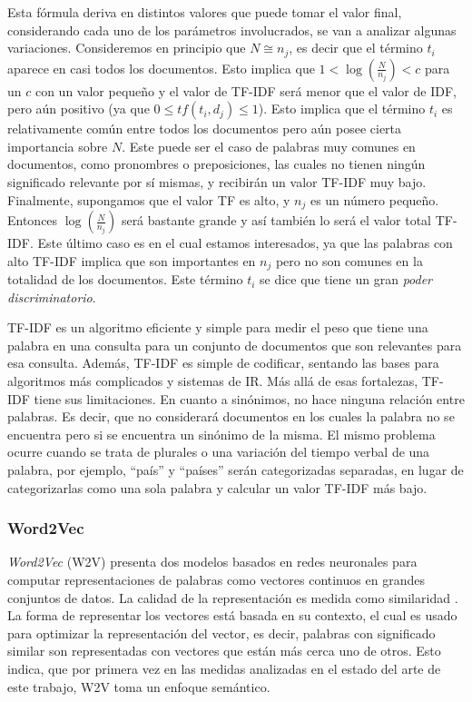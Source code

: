 Esta fórmula deriva en distintos valores que puede tomar el valor final, considerando cada uno de los parámetros involucrados, se van a analizar algunas variaciones. Consideremos en principio que \(N \cong n_j\), es decir que el término \(t_i\) aparece en casi todos los documentos. Esto implica que \(1 <  \log(\frac{N}{n_j}) < c \) para un \(c\) con un valor pequeño y el valor de TF-IDF será menor que el valor de IDF, pero aún positivo (ya que \(0 \leq tf(t_i,d_j) \leq 1\)). Esto implica que el término \(t_i\) es relativamente común entre todos los documentos pero aún posee cierta importancia sobre \(N\). Este puede ser el caso de palabras muy comunes en documentos, como pronombres o preposiciones, las cuales no tienen ningún significado relevante por sí mismas, y recibirán un valor TF-IDF muy bajo. Finalmente, supongamos que el valor TF es alto, y \(n_j\) es un número pequeño. Entonces \(\log(\frac{N}{n_j})\) será bastante grande y así también lo será el valor total TF-IDF. Este último caso es en el cual estamos interesados, ya que las palabras con alto TF-IDF implica que son importantes en \(n_j\) pero no son comunes en la totalidad de los documentos. Este término \(t_i\) se dice que tiene un gran \textit{poder discriminatorio}.

\bigskip TF-IDF es un algoritmo eficiente y simple para medir el peso que tiene una palabra en una consulta para un conjunto de documentos que son relevantes para esa consulta. Además, TF-IDF es simple de codificar, sentando las bases para algoritmos más complicados y sistemas de IR. Más allá de esas fortalezas, TF-IDF tiene sus limitaciones. En cuanto a sinónimos, no hace ninguna relación entre palabras. Es decir, que no considerará documentos en los cuales la palabra no se encuentra pero si se encuentra un sinónimo de la misma. El mismo problema ocurre cuando se trata de plurales o una variación del tiempo verbal de una palabra, por ejemplo, “país” y “países” serán categorizadas separadas, en lugar de categorizarlas como una sola palabra y calcular un valor TF-IDF más bajo.

\subsubsection{Word2Vec}
\textit{Word2Vec} (W2V) presenta dos modelos basados en redes neuronales para computar representaciones de palabras como vectores continuos en grandes conjuntos de datos. La calidad de la representación es medida como similaridad \citep{mikolov2013efficient}. La forma de representar los vectores está basada en su contexto, el cual es usado para optimizar la representación del vector, es decir, palabras con significado similar son representadas con vectores que están más cerca uno de otros. Esto indica, que por primera vez en las medidas analizadas en el estado del arte de este trabajo, W2V toma un enfoque semántico.

